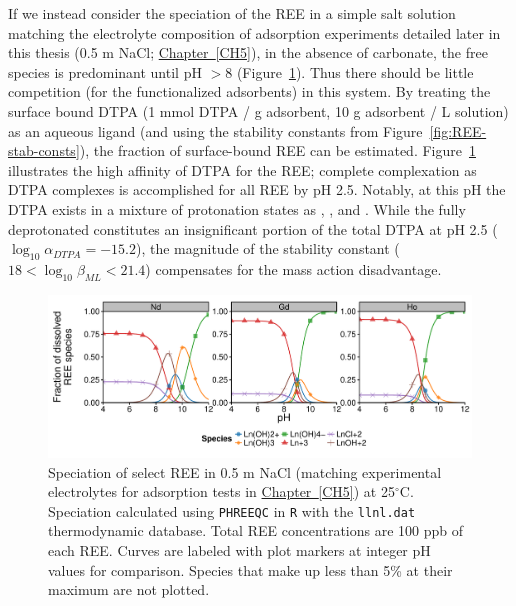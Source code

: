 If we instead consider the speciation of the REE in a simple salt solution matching the electrolyte composition of adsorption experiments detailed later in this thesis (0.5 m NaCl; \hyperref[CH5]{Chapter~\ref*{CH5}}), in the absence of carbonate, the free  species is predominant until pH $>8$ (Figure~\ref{fig:REE-spec-exp}).
Thus there should be little competition (for the functionalized adsorbents) in this system.
By treating the surface bound DTPA (1 mmol DTPA / g adsorbent, 10 g adsorbent / L solution) as an aqueous ligand (and using the stability constants from Figure~\ref{fig:REE-stab-consts}), the fraction of surface-bound REE can be estimated.
Figure~\ref{fig:REE-spec-exp} illustrates the high affinity of DTPA for the REE;
complete complexation as DTPA complexes is accomplished for all REE by pH 2.5.
Notably, at this pH the DTPA exists in a mixture of protonation states as , , and .
While the fully deprotonated  constitutes an insignificant portion of the total DTPA at pH 2.5 ($\log_{10}\alpha_{DTPA}= -15.2$),  the magnitude of the stability constant ($18 < \log_{10} \beta_{ML} < 21.4$) compensates for the mass action disadvantage.

\begin{figure}[htbp]
\begin{center}
\includegraphics[width = \textwidth]{REE-aq-chem-figs/REE-spec-05mNaCl-horiz.pdf}
\caption[Speciation of select REE in 0.5 m NaCl at 25$^\circ$C.]{Speciation of select REE in 0.5 m NaCl (matching experimental electrolytes for adsorption tests in \hyperref[CH5]{Chapter~\ref*{CH5}}) at 25$^\circ$C.
Speciation calculated using \texttt{PHREEQC} \citep{PHREEQC} in \texttt{R} \citep{R} with the \texttt{llnl.dat} thermodynamic database.
Total REE concentrations are 100 ppb of each REE.
Curves are labeled with plot markers at integer pH values for comparison.
Species that make up less than 5\% at their maximum are not plotted.}
\label{fig:REE-spec-exp}
\end{center}
\end{figure}

